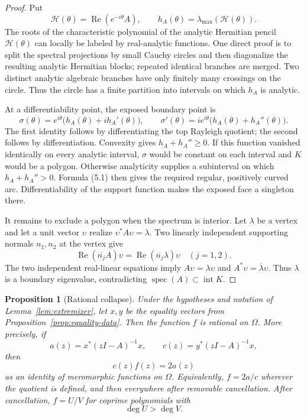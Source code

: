 \documentclass[11pt]{article}
\newtheorem{proposition}[theorem]{Proposition}
\theoremstyle{definition}
\theoremstyle{remark}
\newcommand{\spec}{\operatorname{spec}}
\newcommand{\Rea}{\operatorname{Re}}
\newcommand{\Int}{\operatorname{int}}
\begin{document}
\begin{proof}
Put
\[
 \mathcal H(\theta)=\Rea(e^{-i\theta}A),\qquad
 h_A(\theta)=\lambda_{\max}(\mathcal H(\theta)).
\]
The roots of the characteristic polynomial of the analytic Hermitian pencil
\(\mathcal H(\theta)\) can locally be labeled by real-analytic functions.  One direct
proof is to split the spectral projections by small Cauchy circles and then
diagonalize the resulting analytic Hermitian blocks; repeated identical
branches are merged.  Two distinct analytic algebraic branches have only
finitely many crossings on the circle.  Thus the circle has a finite
partition into intervals on which \(h_A\) is analytic.

At a differentiability point, the exposed boundary point is
\[
 \sigma(\theta)=e^{i\theta}\bigl(h_A(\theta)+ih_A'(\theta)\bigr),\qquad
 \sigma'(\theta)=ie^{i\theta}\bigl(h_A(\theta)+h_A''(\theta)\bigr). \tag{5.1}
\]
The first identity follows by differentiating the top Rayleigh quotient; the
second follows by differentiation.  Convexity gives
\(h_A+h_A''\geq0\).  If this function vanished identically on every analytic
interval, \(\sigma\) would be constant on each interval and \(K\) would be a
polygon.  Otherwise analyticity supplies a subinterval on which
\(h_A+h_A''>0\).  Formula (5.1) then gives the required regular, positively curved
arc.  Differentiability of the support function makes the exposed face a
singleton there.

It remains to exclude a polygon when the spectrum is interior.  Let
\(\lambda\) be a vertex and let a unit vector \(\upsilon\) realize
\(\upsilon^*A\upsilon=\lambda\).  Two linearly independent supporting normals \(n_1,n_2\)
at the vertex give
\[
 \Rea(\overline{n_j}A)\upsilon
 =\Rea(\overline{n_j}\lambda)\upsilon
 \quad(j=1,2).
\]
The two independent real-linear equations imply
\(A\upsilon=\lambda\upsilon\) and
\(A^*\upsilon=\overline\lambda\upsilon\).  Thus \(\lambda\) is a
boundary eigenvalue, contradicting \(\spec(A)\subset\Int K\).
\end{proof}

\begin{proposition}[Rational collapse]\label{prop:rational}
Under the hypotheses and notation of Lemma~\ref{lem:extremizer}, let \(x,y\)
be the equality vectors from Proposition~\ref{prop:equality-data}.  Then the
function \(f\) is rational on \(\Omega\).  More precisely, if
\[
 a(z)=x^*(zI-A)^{-1}x,\qquad c(z)=y^*(zI-A)^{-1}x,
\]
then
\[
 c(z)f(z)=2a(z)                                       \tag{5.2}
\]
as an identity of meromorphic functions on \(\Omega\).  Equivalently,
\(f=2a/c\) wherever the quotient is defined, and then everywhere after
removable cancellation.
After cancellation, \(f=U/V\) for coprime polynomials with
\[
 \deg U>\deg V.                                       \tag{5.3}
\]
\end{proposition}
\end{document}
